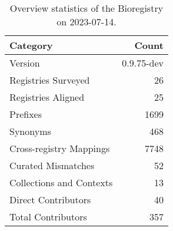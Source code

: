 \begin{table}
\caption{Overview statistics of the Bioregistry on 2023-07-14.}
\label{tab:bioregistry-summary}
\begin{tabular}{lr}
\toprule
Category & Count \\
\midrule
Version & 0.9.75-dev \\
Registries Surveyed & 26 \\
Registries Aligned & 25 \\
Prefixes & 1699 \\
Synonyms & 468 \\
Cross-registry Mappings & 7748 \\
Curated Mismatches & 52 \\
Collections and Contexts & 13 \\
Direct Contributors & 40 \\
Total Contributors & 357 \\
\bottomrule
\end{tabular}
\end{table}
